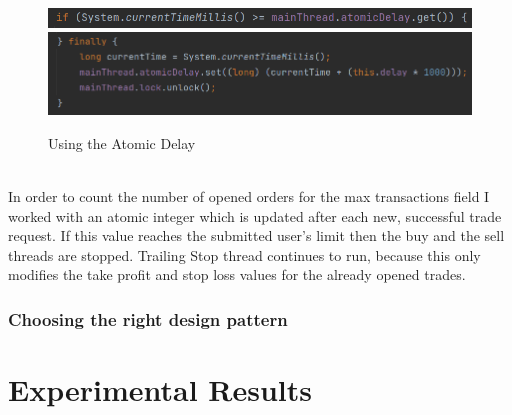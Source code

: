 \documentclass[12pt,a4paper]{report}
\begin{document}
\begin{figure}[!ht]
	\centering
	\includegraphics[scale=0.7]{pics/delay1.png}
	\includegraphics[scale=0.7]{pics/delay2.png}
	\caption{Using the Atomic Delay}
	\label{fig:delay}
\end{figure}
\\
In order to count the number of opened orders for the max transactions field I worked with an atomic integer which is updated after each new, successful trade request. If this value reaches the submitted user's limit then the buy and the sell threads are stopped. Trailing Stop thread continues to run, because this only modifies the take profit and stop loss values for the already opened trades.  
  

\subsection{Choosing the right design pattern}

\chapter{Experimental Results}
\end{document}
